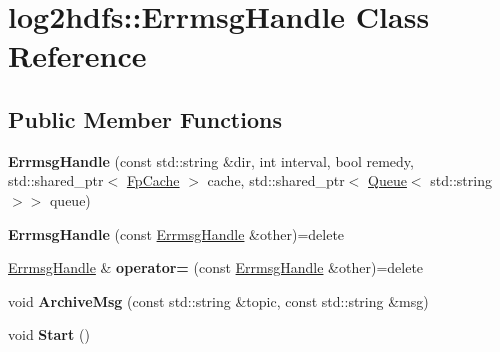 \hypertarget{classlog2hdfs_1_1ErrmsgHandle}{}\section{log2hdfs\+:\+:Errmsg\+Handle Class Reference}
\label{classlog2hdfs_1_1ErrmsgHandle}
\subsection*{Public Member Functions}
\begin{DoxyCompactItemize}
\item 
{\bfseries Errmsg\+Handle} (const std\+::string \&dir, int interval, bool remedy, std\+::shared\+\_\+ptr$<$ \hyperlink{classlog2hdfs_1_1FpCache}{Fp\+Cache} $>$ cache, std\+::shared\+\_\+ptr$<$ \hyperlink{classlog2hdfs_1_1Queue}{Queue}$<$ std\+::string $>$$>$ queue)\hypertarget{classlog2hdfs_1_1ErrmsgHandle_afff82775a3da753d8e23ddd1d5199a3e}{}\label{classlog2hdfs_1_1ErrmsgHandle_afff82775a3da753d8e23ddd1d5199a3e}

\item 
{\bfseries Errmsg\+Handle} (const \hyperlink{classlog2hdfs_1_1ErrmsgHandle}{Errmsg\+Handle} \&other)=delete\hypertarget{classlog2hdfs_1_1ErrmsgHandle_aea6310c5bb49db8b43b39cfad6b96743}{}\label{classlog2hdfs_1_1ErrmsgHandle_aea6310c5bb49db8b43b39cfad6b96743}

\item 
\hyperlink{classlog2hdfs_1_1ErrmsgHandle}{Errmsg\+Handle} \& {\bfseries operator=} (const \hyperlink{classlog2hdfs_1_1ErrmsgHandle}{Errmsg\+Handle} \&other)=delete\hypertarget{classlog2hdfs_1_1ErrmsgHandle_a59e51b33003d563924d6646c1d1974ed}{}\label{classlog2hdfs_1_1ErrmsgHandle_a59e51b33003d563924d6646c1d1974ed}

\item 
void {\bfseries Archive\+Msg} (const std\+::string \&topic, const std\+::string \&msg)\hypertarget{classlog2hdfs_1_1ErrmsgHandle_a2c1a0e1df4123d9baf1d8f4af8cd82bf}{}\label{classlog2hdfs_1_1ErrmsgHandle_a2c1a0e1df4123d9baf1d8f4af8cd82bf}

\item 
void {\bfseries Start} ()\hypertarget{classlog2hdfs_1_1ErrmsgHandle_aa729e777f1067d880fa40ede8a629ae8}{}\label{classlog2hdfs_1_1ErrmsgHandle_aa729e777f1067d880fa40ede8a629ae8}

\end{DoxyCompactItemize}
